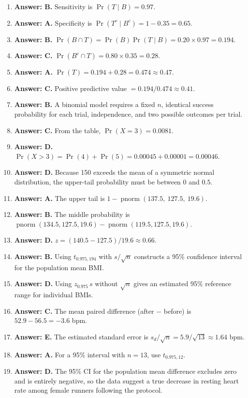 \documentclass[11pt]{article}
\begin{document}
\begin{enumerate}[label=\textbf{Q\arabic*:}, leftmargin=*, itemsep=0.9em]
\item \textbf{Answer: B.} Sensitivity is $\Pr(T\mid B) = 0.97$.
\item \textbf{Answer: A.} Specificity is $\Pr(T^c\mid B^c) = 1 - 0.35 = 0.65$.
\item \textbf{Answer: B.} $\Pr(B\cap T) = \Pr(B)\Pr(T\mid B) = 0.20\times 0.97 = 0.194$.
\item \textbf{Answer: C.} $\Pr(B^c \cap T) = 0.80\times 0.35 = 0.28$.
\item \textbf{Answer: A.} $\Pr(T) = 0.194 + 0.28 = 0.474 \approx 0.47$.
\item \textbf{Answer: C.} Positive predictive value $= 0.194/0.474 \approx 0.41$.
\item \textbf{Answer: B.} A binomial model requires a fixed $n$, identical success probability for each trial, independence, and two possible outcomes per trial.
\item \textbf{Answer: C.} From the table, $\Pr(X=3) = 0.0081$.
\item \textbf{Answer: D.} $\Pr(X>3) = \Pr(4) + \Pr(5) = 0.00045 + 0.00001 = 0.00046$.
\item \textbf{Answer: D.} Because 150 exceeds the mean of a symmetric normal distribution, the upper-tail probability must be between $0$ and $0.5$.
\item \textbf{Answer: A.} The upper tail is $1 - \operatorname{pnorm}(137.5,\ 127.5,\ 19.6)$.
\item \textbf{Answer: B.} The middle probability is $\operatorname{pnorm}(134.5, 127.5, 19.6) - \operatorname{pnorm}(119.5, 127.5, 19.6)$.
\item \textbf{Answer: D.} $z = (140.5 - 127.5)/19.6 \approx 0.66$.
\item \textbf{Answer: B.} Using $t_{0.975,194}$ with $s/\sqrt{n}$ constructs a 95\% confidence interval for the population mean BMI.
\item \textbf{Answer: D.} Using $z_{0.975}\,s$ without $\sqrt{n}$ gives an estimated 95\% reference range for individual BMIs.
\item \textbf{Answer: C.} The mean paired difference (after $-$ before) is $52.9 - 56.5 = -3.6$ bpm.
\item \textbf{Answer: E.} The estimated standard error is $s_d/\sqrt{n} = 5.9/\sqrt{13} \approx 1.64$ bpm.
\item \textbf{Answer: A.} For a 95\% interval with $n=13$, use $t_{0.975,12}$.
\item \textbf{Answer: D.} The 95\% CI for the population mean difference excludes zero and is entirely negative, so the data suggest a true decrease in resting heart rate among female runners following the protocol.

\end{enumerate}
\end{document}

